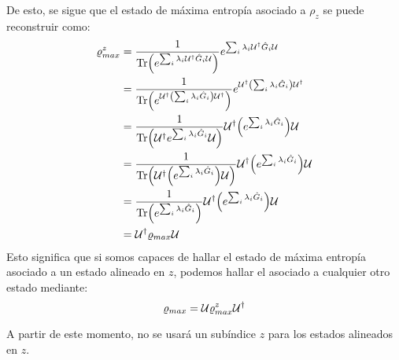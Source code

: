De esto, se sigue que el estado de máxima entropía asociado a $\rho_{z}$ se puede reconstruir como:
\begin{align*}
\varrho_{max}^{z}&=\frac{1}{\Tr(e^{\sum_{i}\lambda_{i}\mathcal{U}^{\dag}\hat{G}_{i}\mathcal{U}})}e^{\sum_{i}\lambda_{i}\mathcal{U}^{\dag}\hat{G}_{i}\mathcal{U}}\\
&=\frac{1}{\Tr(e^{\mathcal{U}^{\dag}\qty(\sum_{i}\lambda_{i}\hat{G}_{i})\mathcal{U}^{\dag}})}e^{\mathcal{U}^{\dag}\qty(\sum_{i}\lambda_{i}\hat{G}_{i})\mathcal{U}^{\dag}}\\
&=\frac{1}{\Tr(\mathcal{U}^{\dag}e^{\sum_{i}\lambda_{i}\hat{G}_{i}}\mathcal{U})}\mathcal{U}^{\dag}\qty(e^{\sum_{i}\lambda_{i}\hat{G}_{i}})\mathcal{U}\\
&=\frac{1}{\Tr(\mathcal{U}^{\dag}\qty(e^{\sum_{i}\lambda_{i}\hat{G}_{i}})\mathcal{U})}\mathcal{U}^{\dag}\qty(e^{\sum_{i}\lambda_{i}\hat{G}_{i}})\mathcal{U}\\
&=\frac{1}{\Tr(e^{\sum_{i}\lambda_{i}\hat{G}_{i}})}\mathcal{U}^{\dag}\qty(e^{\sum_{i}\lambda_{i}\hat{G}_{i}})\mathcal{U}\\
&=\mathcal{U}^{\dag}\varrho_{max}\mathcal{U}
\end{align*}
Esto significa que si somos capaces de hallar el estado de máxima entropía asociado a un estado alineado en $z$, podemos hallar el asociado a cualquier otro estado mediante:
\begin{equation}
\varrho_{max}=\mathcal{U}\varrho_{max}^{z}\mathcal{U}^{\dag}
\end{equation}

A partir de este momento, no se usará un subíndice $z$ para los estados alineados en $z$.
